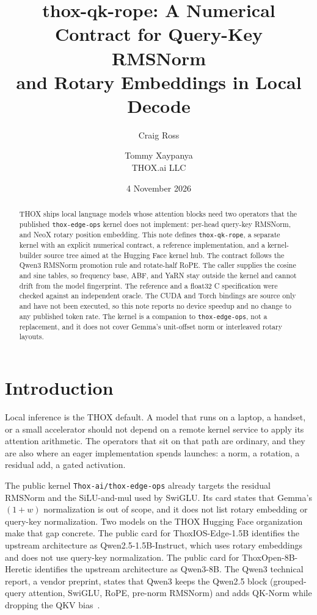\documentclass[11pt]{article}
\title{thox-qk-rope: A Numerical Contract for Query-Key RMSNorm\\
and Rotary Embeddings in Local Decode}
\author{Craig Ross \and Tommy Xaypanya \\ THOX.ai LLC}
\date{4 November 2026}
\begin{document}
\maketitle

\begin{abstract}
THOX ships local language models whose attention blocks need two operators
that the published \texttt{thox-edge-ops} kernel does not implement:
per-head query-key RMSNorm, and NeoX rotary position embedding.
This note defines \texttt{thox-qk-rope}, a separate kernel with an
explicit numerical contract, a reference implementation, and a
kernel-builder source tree aimed at the Hugging Face kernel hub.
The contract follows the Qwen3 RMSNorm promotion rule and rotate-half
RoPE. The caller supplies the cosine and sine tables, so frequency
base, ABF, and YaRN stay outside the kernel and cannot drift from the
model fingerprint. The reference and a float32 C specification were
checked against an independent oracle. The CUDA and Torch bindings are
source only and have not been executed, so this note reports no device
speedup and no change to any published token rate. The kernel is a
companion to \texttt{thox-edge-ops}, not a replacement, and it does
not cover Gemma's unit-offset norm or interleaved rotary layouts.
\end{abstract}

\section{Introduction}

Local inference is the THOX default. A model that runs on a laptop, a
handset, or a small accelerator should not depend on a remote kernel
service to apply its attention arithmetic. The operators that sit on
that path are ordinary, and they are also where an eager implementation
spends launches: a norm, a rotation, a residual add, a gated
activation.

The public kernel \texttt{Thox-ai/thox-edge-ops} already targets the
residual RMSNorm and the SiLU-and-mul used by SwiGLU. Its card states
that Gemma's \((1 + w)\) normalization is out of scope, and it does not
list rotary embedding or query-key normalization. Two models on the
THOX Hugging Face organization make that gap concrete. The public card
for ThoxIOS-Edge-1.5B identifies the upstream architecture as
Qwen2.5-1.5B-Instruct, which uses rotary embeddings and does not use
query-key normalization. The public card for ThoxOpen-8B-Heretic
identifies the upstream architecture as Qwen3-8B. The Qwen3 technical
report, a vendor preprint, states that Qwen3 keeps the Qwen2.5 block
(grouped-query attention, SwiGLU, RoPE, pre-norm RMSNorm) and adds
QK-Norm while dropping the QKV bias~\cite{qwen3}.
\end{document}

